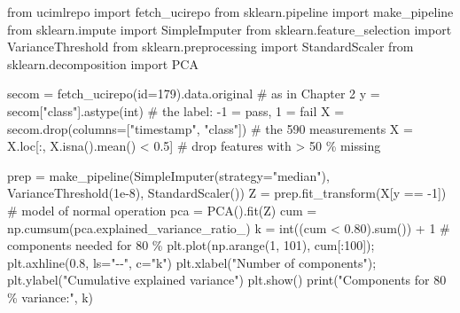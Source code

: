\documentclass[
  letterpaper,
  DIV=11,
  numbers=noendperiod]{scrreprt}
\newenvironment{Shaded}{\begin{snugshade}}{\end{snugshade}}
\newcommand{\BuiltInTok}[1]{\textcolor[rgb]{0.00,0.23,0.31}{#1}}
\newcommand{\CommentTok}[1]{\textcolor[rgb]{0.37,0.37,0.37}{#1}}
\newcommand{\DecValTok}[1]{\textcolor[rgb]{0.68,0.00,0.00}{#1}}
\newcommand{\FloatTok}[1]{\textcolor[rgb]{0.68,0.00,0.00}{#1}}
\newcommand{\ImportTok}[1]{\textcolor[rgb]{0.00,0.46,0.62}{#1}}
\newcommand{\NormalTok}[1]{\textcolor[rgb]{0.00,0.23,0.31}{#1}}
\newcommand{\OperatorTok}[1]{\textcolor[rgb]{0.37,0.37,0.37}{#1}}
\newcommand{\StringTok}[1]{\textcolor[rgb]{0.13,0.47,0.30}{#1}}
\begin{document}
\begin{Shaded}
\begin{Highlighting}[]
\ImportTok{from}\NormalTok{ ucimlrepo }\ImportTok{import}\NormalTok{ fetch\_ucirepo}
\ImportTok{from}\NormalTok{ sklearn.pipeline }\ImportTok{import}\NormalTok{ make\_pipeline}
\ImportTok{from}\NormalTok{ sklearn.impute }\ImportTok{import}\NormalTok{ SimpleImputer}
\ImportTok{from}\NormalTok{ sklearn.feature\_selection }\ImportTok{import}\NormalTok{ VarianceThreshold}
\ImportTok{from}\NormalTok{ sklearn.preprocessing }\ImportTok{import}\NormalTok{ StandardScaler}
\ImportTok{from}\NormalTok{ sklearn.decomposition }\ImportTok{import}\NormalTok{ PCA}

\NormalTok{secom }\OperatorTok{=}\NormalTok{ fetch\_ucirepo(}\BuiltInTok{id}\OperatorTok{=}\DecValTok{179}\NormalTok{).data.original    }\CommentTok{\# as in Chapter 2}
\NormalTok{y }\OperatorTok{=}\NormalTok{ secom[}\StringTok{"class"}\NormalTok{].astype(}\BuiltInTok{int}\NormalTok{)                  }\CommentTok{\# the label: {-}1 = pass, 1 = fail}
\NormalTok{X }\OperatorTok{=}\NormalTok{ secom.drop(columns}\OperatorTok{=}\NormalTok{[}\StringTok{"timestamp"}\NormalTok{, }\StringTok{"class"}\NormalTok{])  }\CommentTok{\# the 590 measurements}
\NormalTok{X }\OperatorTok{=}\NormalTok{ X.loc[:, X.isna().mean() }\OperatorTok{\textless{}} \FloatTok{0.5}\NormalTok{]             }\CommentTok{\# drop features with \textgreater{} 50 \% missing}

\NormalTok{prep }\OperatorTok{=}\NormalTok{ make\_pipeline(SimpleImputer(strategy}\OperatorTok{=}\StringTok{"median"}\NormalTok{), VarianceThreshold(}\FloatTok{1e{-}8}\NormalTok{), StandardScaler())}
\NormalTok{Z }\OperatorTok{=}\NormalTok{ prep.fit\_transform(X[y }\OperatorTok{==} \OperatorTok{{-}}\DecValTok{1}\NormalTok{])           }\CommentTok{\# model of normal operation}
\NormalTok{pca }\OperatorTok{=}\NormalTok{ PCA().fit(Z)}
\NormalTok{cum }\OperatorTok{=}\NormalTok{ np.cumsum(pca.explained\_variance\_ratio\_)}
\NormalTok{k }\OperatorTok{=} \BuiltInTok{int}\NormalTok{((cum }\OperatorTok{\textless{}} \FloatTok{0.80}\NormalTok{).}\BuiltInTok{sum}\NormalTok{()) }\OperatorTok{+} \DecValTok{1}                \CommentTok{\# components needed for 80 \%}
\NormalTok{plt.plot(np.arange(}\DecValTok{1}\NormalTok{, }\DecValTok{101}\NormalTok{), cum[:}\DecValTok{100}\NormalTok{])}\OperatorTok{;}\NormalTok{ plt.axhline(}\FloatTok{0.8}\NormalTok{, ls}\OperatorTok{=}\StringTok{"{-}{-}"}\NormalTok{, c}\OperatorTok{=}\StringTok{"k"}\NormalTok{)}
\NormalTok{plt.xlabel(}\StringTok{"Number of components"}\NormalTok{)}\OperatorTok{;}\NormalTok{ plt.ylabel(}\StringTok{"Cumulative explained variance"}\NormalTok{)}
\NormalTok{plt.show()}
\BuiltInTok{print}\NormalTok{(}\StringTok{"Components for 80 \% variance:"}\NormalTok{, k)}
\end{Highlighting}
\end{Shaded}
\end{document}
